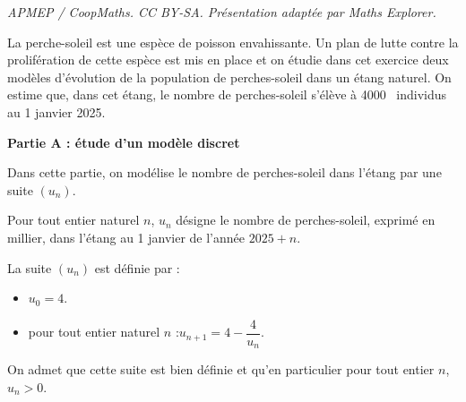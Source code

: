 \documentclass[10pt]{article}
\providecommand{\np}[2][]{{#2~#1}}
\begin{document}
\noindent\textit{APMEP / CoopMaths. CC BY-SA. Présentation adaptée par Maths Explorer.}\par\medskip
La perche-soleil est une espèce de poisson envahissante. Un plan de lutte contre la prolifération de cette espèce est mis en place et on étudie dans cet exercice deux modèles d'évolution de la population de perches-soleil dans un étang naturel. On estime que, dans cet étang, le nombre de perches-soleil s'élève à \np{4000} individus au 1 janvier 2025.

\textbf{Partie A : étude d'un modèle discret}

Dans cette partie, on modélise le nombre de perches-soleil dans l'étang par une suite $(u_n)$.

Pour tout entier naturel $n$, $u_{n}$ désigne le nombre de perches-soleil, exprimé en millier, dans l'étang au 1 janvier de l'année $2025+n$.

La suite $(u_n)$ est définie par :

\begin{itemize}
\item $u_{0}=4$.
\item pour tout entier naturel $n$ :\quad $u_{n+1}=4-\dfrac{4}{u_{n}}$.
\end{itemize}

On admet que cette suite est bien définie et qu'en particulier pour tout entier $n$,\quad $u_{n}>0$.
\end{document}
